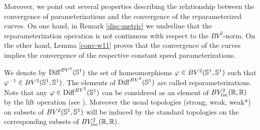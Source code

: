 Moreover, we point out  several properties describing the relationship between the convergence of parameterizations and the convergence of the reparameterized curves.
On one hand, in Remark \ref{disc-metric} we underline that the reparameterization operation is not continuous with respect to the $BV^2$-norm. On the other hand, Lemma \ref{conv-w11} proves that  the convergence of the curves implies the convergence of the respective constant speed parameterizations.

\begin{defn}[{\bf reparameterizations}]\label{reparam}
We denote by 	${\rm Diff}^{BV^2}(\mathbb{S}^1)$  the set of homeomorphisms  $\varphi\in BV^2(\mathbb{S}^1,\mathbb{S}^1)$ such that $\varphi^{-1} \in BV^2(\mathbb{S}^1,\mathbb{S}^1)$. The elements of  ${\rm Diff}^{BV^2}(\mathbb{S}^1)$ are called reparameterizations.
Note that any $\varphi \in {\rm Diff}^{BV^2}(\mathbb{S}^1)$ can be considered as an element of $BV_{loc}^2(\mathbb{R},\mathbb{R})$ by the lift operation (see \cite{ghys}). Moreover the usual topologies (strong, weak, weak*)
on subsets of ${BV^2}(\mathbb{S}^1,\mathbb{S}^1)$ will be induced by the standard topologies on the corresponding subsets of ${BV^2_{loc}}(\mathbb{R},\mathbb{R})$.

\end{defn}

